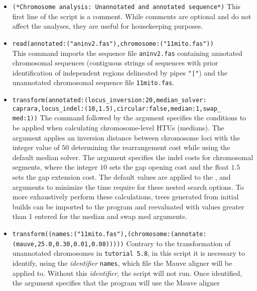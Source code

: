 \begin{itemize}
\item \texttt{(*Chromosome analysis: Unannotated and annotated sequence*)} This first line of the script is a 
comment. While comments are optional and do not affect the analyses, they are useful for housekeeping purposes.
\item \texttt{read(annotated:("aninv2.fas"),chromosome:("11mito.fas"))} \\This command imports the sequence file 
\texttt{aninv2.fas} containing annotated chromosomal sequences (contiguous strings of sequences with prior 
identification of independent regions delineated by pipes \texttt{"|"}) and the unannotated chromosomal 
sequence file \texttt{11mito.fas}. 
\item \texttt{transform(annotated:(locus\_inversion:20,median\_solver:\\caprara,locus\_indel:(10,1.5),circular:false,median:1,swap\_\\
med:1))} The  command followed by the argument  
specifies the conditions to be 
applied when calculating chromosome-level HTUs (medians). The argument  applies an 
inversion distance between chromosome loci with the integer value of $50$ determining the rearrangement cost 
while using the default  median solver. The argument  specifies 
the indel costs for chromosomal segments, where the integer $10$ sets the gap opening cost and the float $1.5$ 
sets the gap extension cost. The default values are applied to the ,  
and  arguments to minimize the time require for these nested search options. To more 
exhaustively perform these calculations, trees generated from initial builds can be imported to the program and reevaluated 
with values greater than 1 entered for the median and swap med arguments.
\item \texttt{transform((names:("11mito.fas"),(chromosome:(annotate:\\(mauve,25.0,0.30,0.01,0.08)))))} 
Contrary to the transformation of unannotated chromosomes in \texttt{tutorial 5.8}, in this script it is necessary to 
identify, using the \emph{identifier} \texttt{names}, which file the Mauve aligner will be applied to. Without this 
\emph{identifier}, the script will not run. Once identified, the argument 
 specifies that the program will use the Mauve aligner \cite{darlingetal2004} 

\end{itemize}
